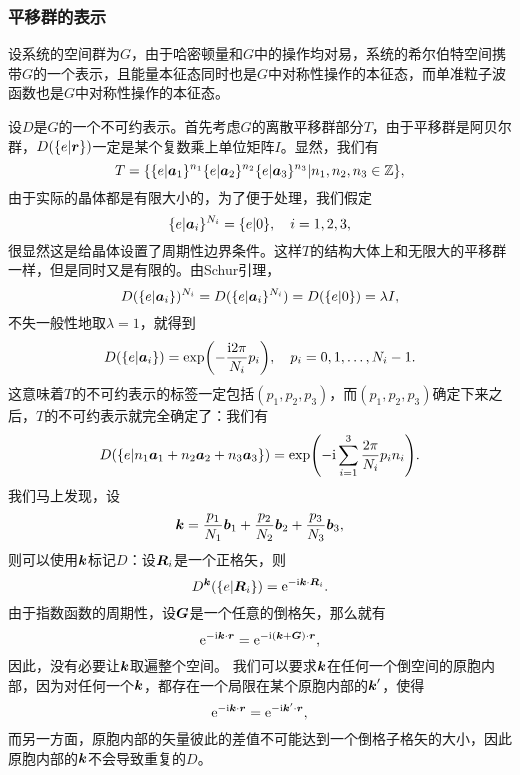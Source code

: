 \subsubsection{平移群的表示}\label{sec:transition-group-rep}

设系统的空间群为$G$，由于哈密顿量和$G$中的操作均对易，系统的希尔伯特空间携带$G$的一个表示，且能量本征态同时也是$G$中对称性操作的本征态，而单准粒子波函数也是$G$中对称性操作的本征态。

设$D$是$G$的一个不可约表示。首先考虑$G$的离散平移群部分$T$，由于平移群是阿贝尔群，$D(\{ e | \vb*{r}\})$一定是某个复数乘上单位矩阵$I$。显然，我们有
\begin{equation}
    T = \{ \{e | \vb*{a}_1\}^{n_1} \{e | \vb*{a}_2\}^{n_2} \{e | \vb*{a}_3\}^{n_3} | n_1, n_2, n_3 \in \mathbb{Z} \},
\end{equation}
由于实际的晶体都是有限大小的，为了便于处理，我们假定
\begin{equation}
    \{e | \vb*{a}_i\}^{N_i} = \{e | 0\}, \quad i = 1, 2, 3,
\end{equation}
很显然这是给晶体设置了周期性边界条件。这样$T$的结构大体上和无限大的平移群一样，但是同时又是有限的。由Schur引理，
\[
    D(\{e | \vb*{a}_i \})^{N_i} = D(\{e | \vb*{a}_i \}^{N_i}) = D(\{e | 0\}) = \lambda I,
\]
不失一般性地取$\lambda = 1$，就得到
\begin{equation}
    D(\{e | \vb*{a}_i\}) = \exp(- \frac{\mathrm{i} 2 \pi}{N_i} p_i), \quad p_i = 0, 1, \ldots, N_i - 1.
\end{equation}
这意味着$T$的不可约表示的标签一定包括$(p_1, p_2, p_3)$，而$(p_1, p_2, p_3)$确定下来之后，$T$的不可约表示就完全确定了：我们有
\begin{equation}
    D(\{e | n_1 \vb*{a}_1 + n_2 \vb*{a}_2 + n_3 \vb*{a}_3\}) = \exp(- \mathrm{i} \sum_{i=1}^3 \frac{2\pi}{N_i} p_i n_i ).
\end{equation}
我们马上发现，设
\begin{equation}
    \vb*{k} = \frac{p_1}{N_1} \vb*{b}_1 + \frac{p_2}{N_2} \vb*{b}_2 + \frac{p_3}{N_3} \vb*{b}_3,
\end{equation}
则可以使用$\vb*{k}$标记$D$：设$\vb*{R}_i$是一个正格矢，则
\begin{equation}
    D^{\vb*{k}}(\{e | \vb*{R}_i \}) = \mathrm{e}^{- \mathrm{i} \vb*{k} \cdot \vb*{R}_i}.
\end{equation}
由于指数函数的周期性，设$\vb*{G}$是一个任意的倒格矢，那么就有
\[
    \mathrm{e}^{- \mathrm{i} \vb*{k} \cdot \vb*{r}} = \mathrm{e}^{- \mathrm{i} (\vb*{k} + \vb*{G}) \cdot \vb*{r}},
\]
因此，没有必要让$\vb*{k}$取遍整个空间。
我们可以要求$\vb*{k}$在任何一个倒空间的原胞内部，因为对任何一个$\vb*{k}$，都存在一个局限在某个原胞内部的$\vb*{k}'$，使得
\[
    \mathrm{e}^{- \mathrm{i} \vb*{k} \cdot \vb*{r}} = \mathrm{e}^{- \mathrm{i} \vb*{k}' \cdot \vb*{r}},
\]
而另一方面，原胞内部的矢量彼此的差值不可能达到一个倒格子格矢的大小，因此原胞内部的$\vb*{k}$不会导致重复的$D$。

